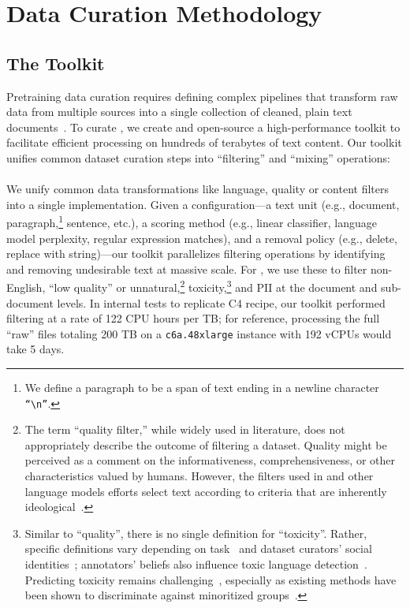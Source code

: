 \section{Data Curation Methodology}
\label{sec:creation}







\subsection{The \dolma Toolkit}
\label{sec:toolkit}
Pretraining data curation requires defining complex pipelines that transform raw data from multiple sources into a single collection of cleaned, plain text documents~\citep{wenzek-etal-2020-ccnet,falcon40b}.
To curate \dolma, we create and open-source a high-performance toolkit to facilitate efficient processing on hundreds of terabytes of text content.
Our toolkit unifies common dataset curation steps into ``filtering'' and ``mixing'' operations: 

\paragraph{\toolkitFilterText} We unify common data transformations like language, quality or content filters into a single implementation. 
Given a configuration---a text unit (e.g., document, paragraph,\footnote{
    We define a paragraph to be a span of text ending in a newline \utf character \texttt{``\textbackslash{}n''}.
} sentence, etc.), a scoring method (e.g., linear classifier, language model perplexity, regular expression matches), and a removal policy (e.g., delete, replace with string)---our toolkit parallelizes filtering operations by identifying and removing undesirable text at massive scale.
For \dolma, we use these to filter non-English, ``low quality'' or unnatural,\footnote{
    The term ``quality filter,'' while widely used in literature, does not appropriately describe the outcome of filtering a dataset. Quality might be perceived as a comment on the informativeness, comprehensiveness, or other characteristics valued by humans. However, the filters used in \dolma and other language models efforts select text according to criteria that are inherently ideological~\citep{gururangan-etal-2022-whose}.
}
toxicity,\footnote{
    Similar to ``quality'', there is no single definition for ``toxicity''.
    Rather, specific definitions vary depending on task~\citep{Vidgen2020-bh} and dataset curators' social identities~\citep{Santy2023-sh};
    annotators' beliefs also influence toxic language detection~\citep{Sap2021-ne}.
    Predicting toxicity remains challenging~\citep{welbl-etal-2021-challenges-detoxifying,markov-2023-holistic-approach-undesired-content-detection}, especially as existing methods have been shown to discriminate against minoritized groups~\citep{xu-etal-2021-detoxifying}.
}
and PII at the document and sub-document levels.
In internal tests to replicate C4 recipe, our toolkit performed filtering at a rate of 122 CPU hours per TB; for reference, processing the full ``raw'' \dolma files totaling 200 TB on a \texttt{c6a.48xlarge} instance with 192 vCPUs would take 5 days.

